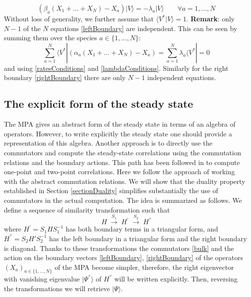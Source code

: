 \documentclass[10pt]{article}
\numberwithin{equation}{section}
\numberwithin{equation}{subsection}
\begin{document}
\begin{equation}\label{rightBoundary}
	\left(\beta_{a}(X_{1}+\ldots+X_{N})-X_{a}\right)|V\rangle=-\lambda_{a}|V\rangle\qquad\forall a=1,\ldots,N
\end{equation}
Without loss of generality, we further assume that $\langle V^{*}|V\rangle=1$. 
\newline \newline
\textbf{Remark}: only $N-1$ of the $N$ equations \eqref{leftBoundary}  are independent. This can be seen by summing them over the species $a\in \{1,\ldots,N\}$:
	\begin{equation}
		\sum_{a=1}^{N}	\langle V^{*}|\left(\alpha_{a}(X_{1}+\ldots+X_{N})-X_{a}\right)=\sum_{a=1}^{N}\lambda_{a}\langle V^{*}|=0
	\end{equation}
	and using  \eqref{ratesConditions} and \eqref{lambdaConditions}.
 Similarly for the right boundary  \eqref{rightBoundary} there are only  $N-1$ independent equations.
\subsection{The explicit form of the steady state}\label{subsection-exact}
The MPA gives an abstract form of the steady state in terms of an algebra of operators. However, to write explicitly the steady state one should provide a representation of this algebra. Another approach is to directly use the commutators and compute the steady-state correlations using the commutation relations and the boundary actions. This path has been followed in \cite{vanicat2017exact} to compute one-point and two-point correlations. 
Here we follow the approach of working with the abstract commutation  relations. We will show that the duality property established in Section \ref{sectionDuality} simplifies substantially the  use of commutators in the actual
computation. The idea is summarized as follows. We define a sequence of similarity transformation such that 
\begin{equation}
	H\;\xrightarrow{S_{1}}\;H^{'}\;\xrightarrow{S_{2}}\;H^{''}
\end{equation} 
where $H^{'}= S_{1} H S_{1}^{-1} $ has both boundary terms in a triangular form, and $H^{''} = S_{2}H' S_{2}^{-1}$ has the left boundary in a triangular form and the right boundary is diagonal. Thanks to these transformations the commutators \eqref{bulk} and the action on the boundary vectors \eqref{leftBoundary}, \eqref{rightBoundary} of the operators $(X_{a})_{a\in\{1,\ldots,N\}}$ of the MPA become simpler, therefore, the right eigenvector with vanishing eigenvalue $|\Psi^{''}\rangle$ of $H^{''}$ will be written explicitly. Then, reversing the transformations we will retrieve $|\Psi\rangle$.
\end{document}
